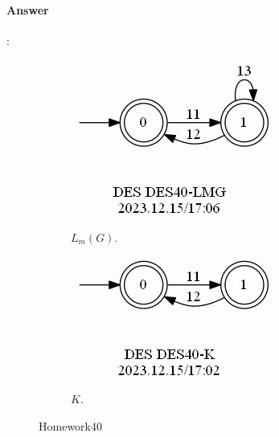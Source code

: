\documentclass{article}
\begin{document}
\paragraph{Answer}:

\begin{figure}[h!]
  \centering
  \begin{subfigure}[b]{0.2\linewidth}
    \includegraphics[width=\linewidth]{assets/DES40-LMG.jpg}
     \caption{$L_m(G)$.}
  \end{subfigure}
  \begin{subfigure}[b]{0.2\linewidth}
    \includegraphics[width=\linewidth]{assets/DES40-K.jpg}
    \caption{$K$.}
  \end{subfigure}
  \caption{Homework40}
  \label{fig:des40}
\end{figure}
\end{document}
